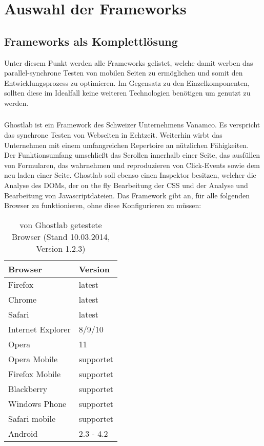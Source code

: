 \chapter{Auswahl der Frameworks}

\section{Frameworks als Komplettlösung}
Unter diesem Punkt werden alle Frameworks gelistet, welche damit werben das parallel-synchrone Testen von mobilen Seiten zu ermöglichen und somit den Entwicklungsprozess zu optimieren. Im Gegensatz zu den Einzelkomponenten, sollten diese im Idealfall keine weiteren Technologien benötigen um genutzt zu werden.
	\subsection{}
	Ghostlab ist ein Framework des Schweizer Unternehmens Vanamco. Es verspricht das synchrone Testen von Webseiten in 		Echtzeit. Weiterhin wirbt das Unternehmen mit einem umfangreichen Repertoire an nützlichen Fähigkeiten. Der 				Funktionsumfang umschließt das Scrollen innerhalb einer Seite, das ausfüllen von  Formularen, das wahrnehmen und 			reproduzieren von Click-Events sowie dem neu laden einer Seite. Ghostlab soll ebenso einen Inspektor besitzen, welcher die 		Analyse des DOMs, der on the fly Bearbeitung der CSS und der Analyse und Bearbeitung von Javascriptdateien. Das 			Framework gibt an, für alle folgenden Browser zu funktionieren, ohne diese Konfigurieren zu müssen:

	\begin{table}[H]
 		\centering
			\begin{tabular}{| p{5cm} | p{5cm} |}
			
			\hline
				Browser 	& 	Version\\
			\hline
			\hline
				Firefox	&	latest\\
				Chrome	&	latest\\
				Safari	&	latest\\
				Internet Explorer	&	8/9/10\\
				Opera	&	11\\
				Opera Mobile	&	supportet\\
				Firefox Mobile	&	supportet\\
				Blackberry	&	supportet\\
				Windows Phone	&	supportet\\
				Safari mobile	&	supportet\\	
				Android	&	2.3 - 4.2\\
				\hline
				\end{tabular}
			\caption{von Ghostlab getestete Browser (Stand 10.03.2014, Version 1.2.3)}
	\end{table}

